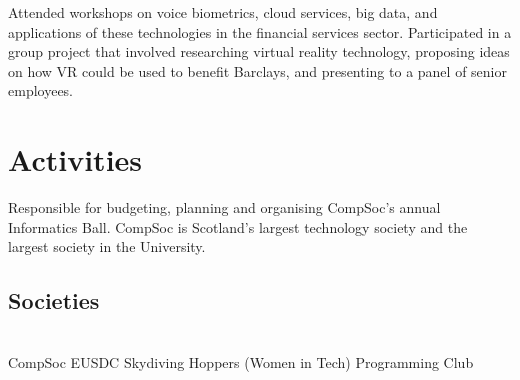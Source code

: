 \documentclass[]{deedy-resume-openfont}
\begin{document}
\begin{minipage}[t]{0.66\textwidth}
Attended workshops on voice biometrics, cloud services, big data, and applications of these technologies in the financial services sector. Participated in a group project that involved researching virtual reality technology, proposing ideas on how VR could be used to benefit Barclays, and presenting to a panel of senior employees.
\sectionsep


\section{Activities} 
Responsible for budgeting, planning and organising CompSoc's annual Informatics Ball. CompSoc is Scotland's largest technology society and the largest society in the University.
\sectionsep
\sectionsep

\subsection{Societies} \\
CompSoc \textbullet{} EUSDC Skydiving \textbullet{} Hoppers (Women in Tech) \textbullet{} Programming Club

\end{minipage} 
\end{document}
